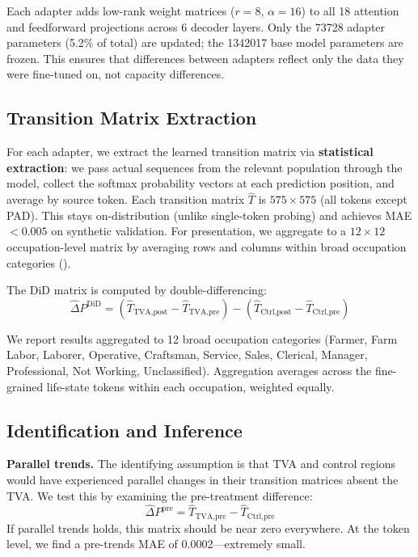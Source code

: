 \documentclass[12pt]{article}
\begin{document}
Each adapter adds low-rank weight matrices ($r=8$, $\alpha=16$) to all 18 attention and feedforward projections across 6 decoder layers. Only the \num{73728} adapter parameters (5.2\% of total) are updated; the \num{1342017} base model parameters are frozen. This ensures that differences between adapters reflect only the data they were fine-tuned on, not capacity differences.

\subsection{Transition Matrix Extraction}

For each adapter, we extract the learned transition matrix via \textbf{statistical extraction}: we pass actual sequences from the relevant population through the model, collect the softmax probability vectors at each prediction position, and average by source token. Each transition matrix $\hat{T}$ is $575 \times 575$ (all tokens except PAD). This stays on-distribution (unlike single-token probing) and achieves MAE $< 0.005$ on synthetic validation. For presentation, we aggregate to a $12 \times 12$ occupation-level matrix by averaging rows and columns within broad occupation categories ().

The DiD matrix is computed by double-differencing:
\begin{equation}
\hat{\Delta} P^{\text{DiD}} = (\hat{T}_{\text{TVA,post}} - \hat{T}_{\text{TVA,pre}}) - (\hat{T}_{\text{Ctrl,post}} - \hat{T}_{\text{Ctrl,pre}})
\end{equation}

We report results aggregated to 12 broad occupation categories (Farmer, Farm Labor, Laborer, Operative, Craftsman, Service, Sales, Clerical, Manager, Professional, Not Working, Unclassified). Aggregation averages across the fine-grained life-state tokens within each occupation, weighted equally.

\subsection{Identification and Inference}

\textbf{Parallel trends.} The identifying assumption is that TVA and control regions would have experienced parallel changes in their transition matrices absent the TVA. We test this by examining the pre-treatment difference:
\begin{equation}
\hat{\Delta} P^{\text{pre}} = \hat{T}_{\text{TVA,pre}} - \hat{T}_{\text{Ctrl,pre}}
\end{equation}
If parallel trends holds, this matrix should be near zero everywhere. At the token level, we find a pre-trends MAE of 0.0002---extremely small.
\end{document}

